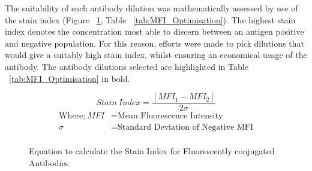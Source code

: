 The suitability of each antibody dilution was mathematically assessed by use of the stain index (Figure ~\ref{eq:si}, Table ~\ref{tab:MFI_Optimisation}). The highest stain index denotes the concentration most able to discern between an antigen positive and negative population. For this reason, efforts were made to pick dilutions that would give a suitably high stain index, whilst ensuring an economical usage of the antibody. The antibody dilutions selected are highlighted in Table ~\ref{tab:MFI_Optimisation} in bold. \\

\begin{figure}[!htbp]
\[ Stain\ Index=\frac{[MFI_1 - MFI_2]}{2\sigma}\]
\normalsize
\begin{align*}
\text{Where;} ~ MFI&= \text{Mean\ Fluorescence\ Intensity} \\
\sigma &= \text{Standard\ Deviation\ of\ Negative\ MFI} \\
\end{align*}
\caption[Equation to calculate the Stain Index for Fluorescently conjugated Antibodies]{Equation to calculate the Stain Index for Fluorescently conjugated Antibodies}
\label{eq:si}
\end{figure}

